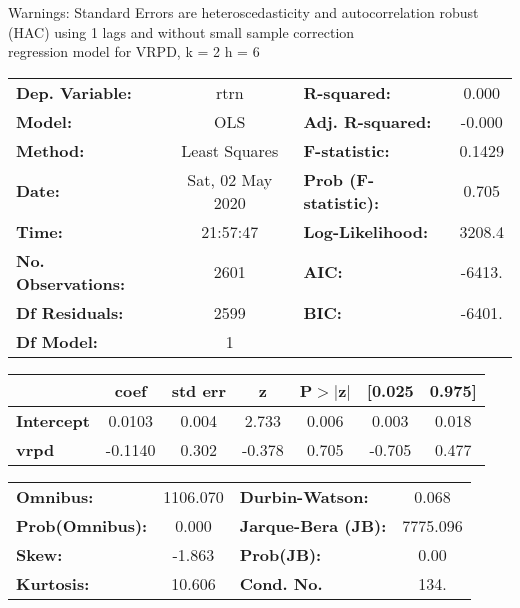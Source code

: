 Warnings: \newline
 [1] Standard Errors are heteroscedasticity and autocorrelation robust (HAC) using 1 lags and without small sample correction\\ 

regression model for VRPD, k = 2 h = 6\begin{center}
\begin{tabular}{lclc}
\toprule
\textbf{Dep. Variable:}    &       rtrn       & \textbf{  R-squared:         } &     0.000   \\
\textbf{Model:}            &       OLS        & \textbf{  Adj. R-squared:    } &    -0.000   \\
\textbf{Method:}           &  Least Squares   & \textbf{  F-statistic:       } &    0.1429   \\
\textbf{Date:}             & Sat, 02 May 2020 & \textbf{  Prob (F-statistic):} &    0.705    \\
\textbf{Time:}             &     21:57:47     & \textbf{  Log-Likelihood:    } &    3208.4   \\
\textbf{No. Observations:} &        2601      & \textbf{  AIC:               } &    -6413.   \\
\textbf{Df Residuals:}     &        2599      & \textbf{  BIC:               } &    -6401.   \\
\textbf{Df Model:}         &           1      & \textbf{                     } &             \\
\bottomrule
\end{tabular}
\begin{tabular}{lcccccc}
                   & \textbf{coef} & \textbf{std err} & \textbf{z} & \textbf{P$> |$z$|$} & \textbf{[0.025} & \textbf{0.975]}  \\
\midrule
\textbf{Intercept} &       0.0103  &        0.004     &     2.733  &         0.006        &        0.003    &        0.018     \\
\textbf{vrpd}      &      -0.1140  &        0.302     &    -0.378  &         0.705        &       -0.705    &        0.477     \\
\bottomrule
\end{tabular}
\begin{tabular}{lclc}
\textbf{Omnibus:}       & 1106.070 & \textbf{  Durbin-Watson:     } &    0.068  \\
\textbf{Prob(Omnibus):} &   0.000  & \textbf{  Jarque-Bera (JB):  } & 7775.096  \\
\textbf{Skew:}          &  -1.863  & \textbf{  Prob(JB):          } &     0.00  \\
\textbf{Kurtosis:}      &  10.606  & \textbf{  Cond. No.          } &     134.  \\
\bottomrule
\end{tabular}
\end{center}

